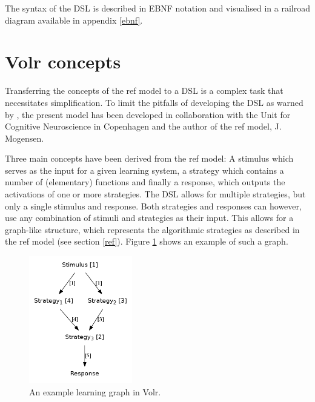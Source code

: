 \documentclass[a4paper,oneside]{memoir}
\begin{document}
The syntax of the DSL is described in EBNF notation and visualised in a
railroad diagram available in appendix \ref{ebnf}.

\section{Volr concepts}
Transferring the concepts of the \gls{ref} model to a DSL is a complex task
that necessitates simplification.
To limit the pitfalls of developing the DSL as warned by \cite{Mernik2005},
the present model has been developed in collaboration with the Unit for
Cognitive Neuroscience in Copenhagen and the author of the \gls{ref} model,
J. Mogensen.

Three main concepts have been derived from the \gls{ref} model: A stimulus which
serves as the input for a given learning system, a strategy which contains
a number of (elementary) functions and finally a response, which outputs the
activations of one or more strategies. The DSL allows for multiple
strategies, but only a single stimulus and response. Both strategies and
responses can however, use any combination of stimuli and strategies as their
input. This allows for a graph-like structure, which represents the algorithmic
strategies as described in the \gls{ref} model (see section \ref{ref}). Figure
\ref{volr:graph} shows an example of such a graph.

\begin{figure}
  \begin{center}
    \includegraphics[width=0.4\textwidth]{volr.png}
    \caption{An example learning graph in Volr.}
    \label{volr:graph}
  \end{center}
\end{figure}
\end{document}
